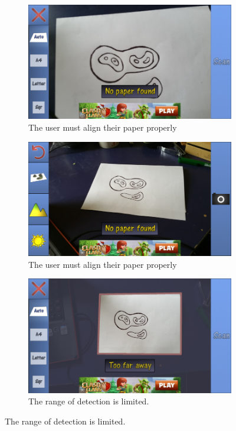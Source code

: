 \documentclass[11pt]{article}
\begin{document}
\begin{figure}[!ht]
	\centering
	\begin{subfigure}[t]{.4\textwidth}
		\centering
		\includegraphics[scale=0.3]{pics/landscapeARNoPaper.png}
		\caption{The user must align their paper properly}
		\label{fig:landscapeARNoPaper1}
	\end{subfigure}
	\hfill
	\begin{subfigure}[t]{.4\textwidth}
		\centering
		\includegraphics[scale=0.3]{pics/landscapeARNoPaper2.png}
		\caption{The user must align their paper properly}
		\label{fig:landscapeARNoPaper2}
	\end{subfigure}
	
	
	\begin{subfigure}[t]{.4\textwidth}
		\centering
		\includegraphics[scale=0.3]{pics/landscapeARTooFar.png}
		\caption{The range of detection is limited.}
		\label{fig:landscapeARNoTooFar}
	\end{subfigure}


\end{figure}
\end{document}
